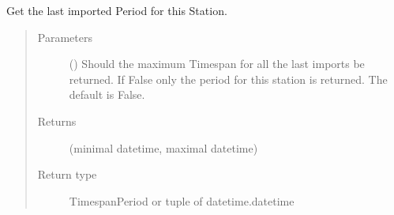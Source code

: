\documentclass[letterpaper,10pt,english]{sphinxmanual}
\begin{document}
\begin{fulllineitems}
\begin{fulllineitems}
\begin{quote}
\begin{description}
\end{description}\end{quote}

\end{fulllineitems}


\begin{fulllineitems}
\label{\detokenize{weatherDB:weatherDB.station.StationBase.get_last_imp_period}}
\sphinxAtStartPar
Get the last imported Period for this Station.
\begin{quote}\begin{description}
\item[{Parameters}] \leavevmode
\sphinxAtStartPar
{} (\sphinxstyleliteralemphasis{\sphinxupquote{, }}) \textendash{} Should the maximum Timespan for all the last imports be returned.
If False only the period for this station is returned.
The default is False.

\item[{Returns}] \leavevmode
\sphinxAtStartPar
(minimal datetime, maximal datetime)

\item[{Return type}] \leavevmode
\sphinxAtStartPar
TimespanPeriod or tuple of datetime.datetime

\end{description}\end{quote}

\end{fulllineitems}


\begin{fulllineitems}
\label{\detokenize{weatherDB:weatherDB.station.StationBase.get_ma}}
\end{fulllineitems}



\end{fulllineitems}
\end{document}
